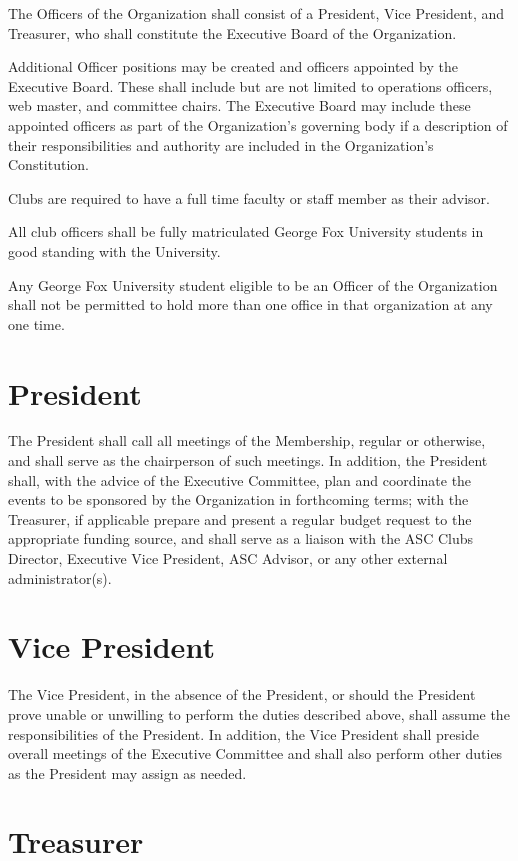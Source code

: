 \documentclass[12pt]{constitution}
\begin{document}
The Officers of the Organization shall consist of a President, Vice President, and Treasurer, who shall constitute the Executive Board of the Organization.

Additional Officer positions may be created and officers appointed by the Executive Board. These shall include but are not limited to operations officers, web master, and committee chairs. The Executive Board may include these appointed officers as part of the Organization’s governing body if a description of their responsibilities and authority are included in the Organization’s Constitution.

Clubs are required to have a full time faculty or staff member as their advisor.

All club officers shall be fully matriculated George Fox University students in good standing with the University.

Any George Fox University student eligible to be an Officer of the Organization shall not be permitted to hold more than one office in that organization at any one time.

\section{President}

The President shall call all meetings of the Membership, regular or otherwise, and shall serve as the chairperson of such meetings. 
In addition, the President shall, with the advice of the Executive Committee, plan and coordinate the events to be sponsored by the Organization in forthcoming terms; with the Treasurer, if applicable prepare and present a regular budget request to the appropriate funding source, and shall serve as a liaison with the ASC Clubs Director, Executive Vice President, ASC Advisor, or any other external administrator(s).

\section{Vice President}

The Vice President, in the absence of the President, or should the President prove unable or unwilling to perform the duties described above, shall assume the responsibilities of the President. 
In addition, the Vice President shall preside overall meetings of the Executive Committee and shall also perform other duties as the President may assign as needed.

\section{Treasurer}
\end{document}
